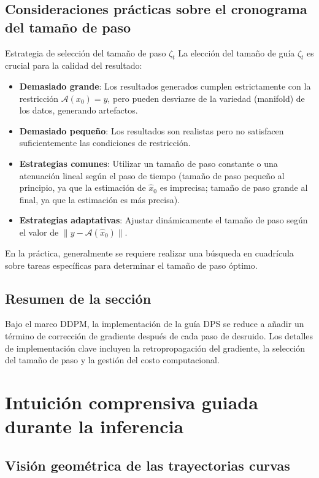 \documentclass[a4paper]{article}
\begin{document}
\subsection{Consideraciones prácticas sobre el cronograma del tamaño de paso}

\begin{knowledgebox}{Estrategia de selección del tamaño de paso $\zeta_t$}
La elección del tamaño de guía $\zeta_t$ es crucial para la calidad del resultado:
\begin{itemize}
    \item \textbf{Demasiado grande}: Los resultados generados cumplen estrictamente con la restricción $\mathcal{A}(x_0) = y$, pero pueden desviarse de la variedad (manifold) de los datos, generando artefactos.
    \item \textbf{Demasiado pequeño}: Los resultados son realistas pero no satisfacen suficientemente las condiciones de restricción.
    \item \textbf{Estrategias comunes}: Utilizar un tamaño de paso constante o una atenuación lineal según el paso de tiempo (tamaño de paso pequeño al principio, ya que la estimación de $\hat{x}_0$ es imprecisa; tamaño de paso grande al final, ya que la estimación es más precisa).
    \item \textbf{Estrategias adaptativas}: Ajustar dinámicamente el tamaño de paso según el valor de $\| y - \mathcal{A}(\hat{x}_0) \|$.
\end{itemize}
En la práctica, generalmente se requiere realizar una búsqueda en cuadrícula sobre tareas específicas para determinar el tamaño de paso óptimo.
\end{knowledgebox}

\subsection{Resumen de la sección}

Bajo el marco DDPM, la implementación de la guía DPS se reduce a añadir un término de corrección de gradiente después de cada paso de desruido. Los detalles de implementación clave incluyen la retropropagación del gradiente, la selección del tamaño de paso y la gestión del costo computacional.

\section{Intuición comprensiva guiada durante la inferencia}

\subsection{Visión geométrica de las trayectorias curvas}
\end{document}
